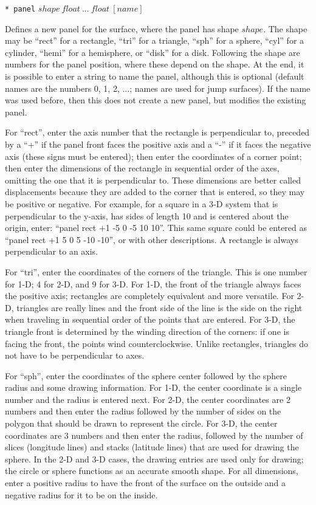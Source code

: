 \documentclass {scrbook}
\newcommand {\ttt} {\texttt}
\begin{document}
\begin{description}
\item{\ttt{* panel} $shape\ float\ ...\ float\ [name]$}

Defines a new panel for the surface, where the panel has shape $shape$.  The shape may be ``rect'' for a rectangle, ``tri'' for a triangle, ``sph'' for a sphere, ``cyl'' for a cylinder, ``hemi'' for a hemisphere, or ``disk'' for a disk. Following the shape are numbers for the panel position, where these depend on the shape. At the end, it is possible to enter a string to name the panel, although this is optional (default names are the numbers 0, 1, 2, ...; names are used for jump surfaces). If the name was used before, then this does not create a new panel, but modifies the existing panel.

For ``rect'', enter the axis number that the rectangle is perpendicular to, preceded by a ``+'' if the panel front faces the positive axis and a ``-'' if it faces the negative axis (these signs must be entered); then enter the coordinates of a corner point; then enter the dimensions of the rectangle in sequential order of the axes, omitting the one that it is perpendicular to. These dimensions are better called displacements because they are added to the corner that is entered, so they may be positive or negative. For example, for a square in a 3-D system that is perpendicular to the y-axis, has sides of length 10 and is centered about the origin, enter: ``panel rect +1 -5 0 -5 10 10''. This same square could be entered as ``panel rect +1 5 0 5 -10 -10'', or with other descriptions. A rectangle is always perpendicular to an axis.

For ``tri'', enter the coordinates of the corners of the triangle. This is one number for 1-D; 4 for 2-D, and 9 for 3-D. For 1-D, the front of the triangle always faces the positive axis; rectangles are completely equivalent and more versatile. For 2-D, triangles are really lines and the front side of the line is the side on the right when traveling in sequential order of the points that are entered. For 3-D, the triangle front is determined by the winding direction of the corners: if one is facing the front, the points wind counterclockwise. Unlike rectangles, triangles do not have to be perpendicular to axes.

For ``sph'', enter the coordinates of the sphere center followed by the sphere radius and some drawing information. For 1-D, the center coordinate is a single number and the radius is entered next. For 2-D, the center coordinates are 2 numbers and then enter the radius followed by the number of sides on the polygon that should be drawn to represent the circle. For 3-D, the center coordinates are 3 numbers and then enter the radius, followed by the number of slices (longitude lines) and stacks (latitude lines) that are used for drawing the sphere. In the 2-D and 3-D cases, the drawing entries are used only for drawing; the circle or sphere functions as an accurate smooth shape. For all dimensions, enter a positive radius to have the front of the surface on the outside and a negative radius for it to be on the inside.


\end{description}
\end{document}
